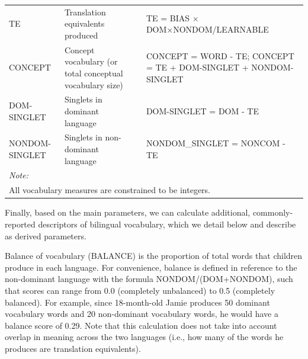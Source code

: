 \documentclass[
  english,
  ,man,floatsintext]{apa6}
\begin{document}
\begin{landscape}
\begin{table}
\begin{tabular}[t]{l>{\raggedright\arraybackslash}p{175px}>{\raggedright\arraybackslash}p{175px}>{\raggedright\arraybackslash}p{175px}}
\hspace{1em}TE & Translation equivalents produced &  & TE = BIAS × DOM×NONDOM/LEARNABLE\\
\hspace{1em}CONCEPT & Concept vocabulary (or total conceptual vocabulary size) &  & CONCEPT = WORD - TE; CONCEPT = TE + DOM-SINGLET + NONDOM-SINGLET\\
\hspace{1em}DOM-SINGLET & Singlets in dominant language &  & DOM-SINGLET = DOM - TE\\
\hspace{1em}NONDOM-SINGLET & Singlets in non-dominant language &  & NONDOM\_SINGLET = NONCOM - TE\\
\bottomrule
\multicolumn{4}{l}{\rule{0pt}{1em}\textit{Note: }}\\
\multicolumn{4}{l}{\rule{0pt}{1em}All vocabulary measures are constrained to be integers.}\\
\end{tabular}
\end{table}
\end{landscape}

Finally, based on the main parameters, we can calculate additional, commonly-reported descriptors of bilingual vocabulary, which we detail below and describe as derived parameters.

Balance of vocabulary (BALANCE) is the proportion of total words that children produce in each language. For convenience, balance is defined in reference to the non-dominant language with the formula NONDOM/(DOM+NONDOM), such that scores can range from 0.0 (completely unbalanced) to 0.5 (completely balanced). For example, since 18-month-old Jamie produces 50 dominant vocabulary words and 20 non-dominant vocabulary words, he would have a balance score of 0.29. Note that this calculation does not take into account overlap in meaning across the two languages (i.e., how many of the words he produces are translation equivalents).
\end{document}
